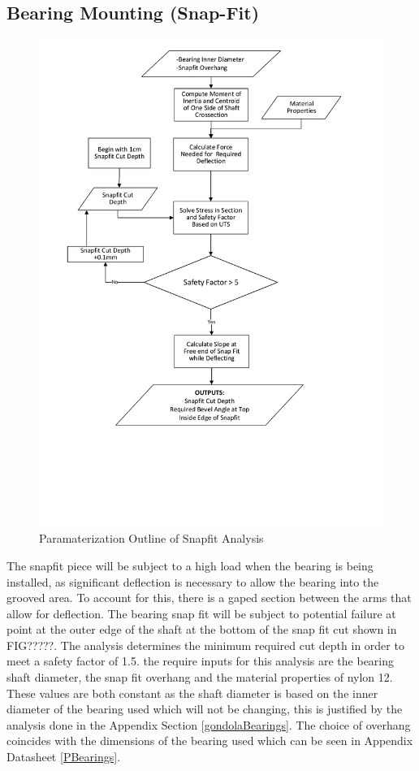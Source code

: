 \documentclass[../main.tex]{subfiles}
\begin{document}
\subsection{Bearing Mounting (Snap-Fit)} \label{snapFit}
\begin{figure}[H]
	\centering
	\includegraphics[width=1 \textwidth]{img/Paramaterization/snapFit.pdf}
	\caption{Paramaterization Outline of Snapfit Analysis}
	\label{fig:snapParamaterization}
\end{figure}


The snapfit piece will be subject to a high load when the bearing is being installed, as significant deflection is necessary to allow the bearing into the grooved area. To account for this, there is a gaped section between the arms that allow for deflection. The bearing snap fit will be subject to potential failure at point at the outer edge of the shaft at the bottom of the snap fit cut shown in FIG?????. The analysis determines the minimum required cut depth in order to meet a safety factor of 1.5. the require inputs for this analysis are the bearing shaft diameter, the snap fit overhang and the material properties of nylon 12. These values are both constant as the shaft diameter is based on the inner diameter of the bearing used which will not be changing, this is justified by the analysis done in the Appendix Section \ref{gondolaBearings}. The choice of overhang coincides with the dimensions of the bearing used which can be seen in Appendix Datasheet \ref{PBearings}.\\  
\end{document}
